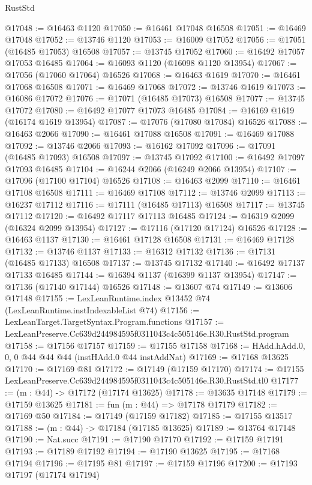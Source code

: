 \begin{lexlean}{RustStd}
\begin{coremodule}
@17048 := @16463 @1120
@17050 := @16461 @17048 @16508
@17051 := @16469 @17048
@17052 := @13746 @1120
@17053 := @16009 @17052
@17056 := @17051 (@16485 @17053) @16508
@17057 := @13745 @17052
@17060 := @16492 @17057 @17053 @16485
@17064 := @16093 @1120 (@16098 @1120 @13954)
@17067 := @17056 (@17060 @17064) @16526
@17068 := @16463 @1619
@17070 := @16461 @17068 @16508
@17071 := @16469 @17068
@17072 := @13746 @1619
@17073 := @16086 @17072
@17076 := @17071 (@16485 @17073) @16508
@17077 := @13745 @17072
@17080 := @16492 @17077 @17073 @16485
@17084 := @16169 @1619 (@16174 @1619 @13954)
@17087 := @17076 (@17080 @17084) @16526
@17088 := @16463 @2066
@17090 := @16461 @17088 @16508
@17091 := @16469 @17088
@17092 := @13746 @2066
@17093 := @16162 @17092
@17096 := @17091 (@16485 @17093) @16508
@17097 := @13745 @17092
@17100 := @16492 @17097 @17093 @16485
@17104 := @16244 @2066 (@16249 @2066 @13954)
@17107 := @17096 (@17100 @17104) @16526
@17108 := @16463 @2099
@17110 := @16461 @17108 @16508
@17111 := @16469 @17108
@17112 := @13746 @2099
@17113 := @16237 @17112
@17116 := @17111 (@16485 @17113) @16508
@17117 := @13745 @17112
@17120 := @16492 @17117 @17113 @16485
@17124 := @16319 @2099 (@16324 @2099 @13954)
@17127 := @17116 (@17120 @17124) @16526
@17128 := @16463 @1137
@17130 := @16461 @17128 @16508
@17131 := @16469 @17128
@17132 := @13746 @1137
@17133 := @16312 @17132
@17136 := @17131 (@16485 @17133) @16508
@17137 := @13745 @17132
@17140 := @16492 @17137 @17133 @16485
@17144 := @16394 @1137 (@16399 @1137 @13954)
@17147 := @17136 (@17140 @17144) @16526
@17148 := @13607 @74
@17149 := @13606 @17148
@17155 := LexLeanRuntime.index @13452 @74 (LexLeanRuntime.instIndexableList @74)
@17156 := LexLeanTarget.TargetSyntax.Program.functions
@17157 := LexLeanPreserve.Cc639d244984595f0311043c4c505146e.R30.RustStd.program
@17158 := @17156 @17157
@17159 := @17155 @17158
@17168 := HAdd.hAdd.{0, 0, 0} @44 @44 @44 (instHAdd.{0} @44 instAddNat)
@17169 := @17168 @13625
@17170 := @17169 @81
@17172 := @17149 (@17159 @17170)
@17174 := @17155 LexLeanPreserve.Cc639d244984595f0311043c4c505146e.R30.RustStd.tl0
@17177 := (m : @44) -> @17172 (@17174 @13625)
@17178 := @13635 @17148
@17179 := @17159 @13625
@17181 := fun (m : @44) => @17178 @17179
@17182 := @17169 @50
@17184 := @17149 (@17159 @17182)
@17185 := @17155 @13517
@17188 := (m : @44) -> @17184 (@17185 @13625)
@17189 := @13764 @17148
@17190 := Nat.succ
@17191 := @17190 @17170
@17192 := @17159 @17191
@17193 := @17189 @17192
@17194 := @17190 @13625
@17195 := @17168 @17194
@17196 := @17195 @81
@17197 := @17159 @17196
@17200 := @17193 @17197 (@17174 @17194)

\end{coremodule}
\end{lexlean}
